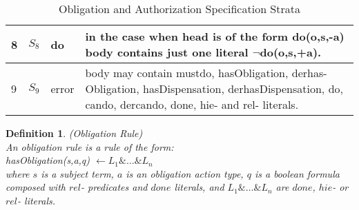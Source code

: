 \documentclass[12pt,journal,letterpaper,onecolumn]{IEEEtran}
\newtheorem{definition}{Definition}[section]
\begin{document}
\begin{table}[h]
\begin{center}
\begin{minipage}[t]{6in}
\begin{tabular}{|l|l|l|p{3.2in}|}
 8 & $S_8 $& do & in the case when head is of the form
do(o,s,-a) body
contains just one literal $\neg$do(o,s,+a).\\

\hline

9 & $S_9$ & error & body may contain mustdo, hasObligation, derhas-
Obligation, hasDispensation, derhasDispensation, do, cando,
dercando, done,
hie- and rel- literals.\\

\hline
\end{tabular}
\normalsize
\end{minipage}
\end{center}
\caption{Obligation and Authorization Specification Strata}
\label{table:strata}
\end{table}




\begin{definition}(Obligation Rule)\\
An {\em obligation rule} is a rule of the form:\\
{\ttfamily hasObligation(s,a,q)} $\leftarrow L_1 \& \ldots \& L_n$\\
 where $s$
is a subject term, $a$ is an obligation action type, $q$ is a
boolean formula composed with $rel$- predicates and $done$ literals,
and $L_1 \& \ldots \& L_n$ are $done$, $hie$- or $rel$- literals.
\label{def:obligationrule}
\end{definition}
\end{document}
